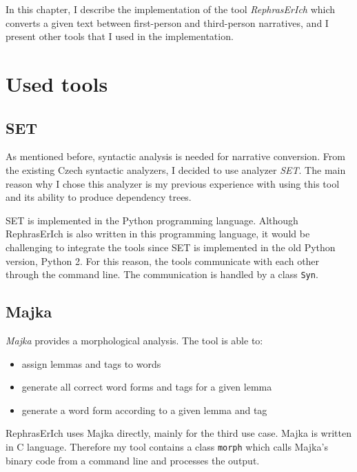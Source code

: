 In this chapter, I describe the implementation of the tool \emph{RephrasErIch} which converts a given text between first-person and third-person narratives, and I present other tools that I used in the implementation.

\section{Used tools}

\subsection{SET}

As mentioned before, syntactic analysis is needed for narrative conversion. From the existing Czech syntactic analyzers, I decided to use analyzer \emph{SET}. The main reason why I chose this analyzer is my previous experience with using this tool and its ability to produce dependency trees.

SET is implemented in the Python programming language. Although RephrasErIch is also written in this programming language, it would be challenging to integrate the tools since SET is implemented in the old Python version, Python 2. For this reason, the tools communicate with each other through the command line. The communication is handled by a class \texttt{Syn}.

\subsection{Majka}

\emph{Majka} \cite{majka} provides a morphological analysis. The tool is able to:
\begin{itemize}
	\item assign lemmas and tags to words
	\item generate all correct word forms and tags for a given lemma
	\item generate a word form according to a given lemma and tag
\end{itemize}

RephrasErIch uses Majka directly, mainly for the third use case. Majka is written in C language. Therefore my tool contains a class \texttt{morph} which calls Majka's binary code from a command line and processes the output.

